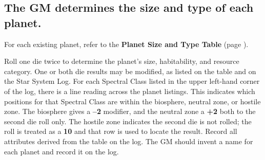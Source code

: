 \begin{table}[htbp]
  \centering
\end{table}

\subsection[Size And Type]{The GM determines the size and type of
  each planet.}
\label{sec:size-and-type}
 
For each existing planet, refer to the \textbf{Planet Size and Type
  Table} (page \pageref{tab:planet-size-type}).

Roll one die twice to determine the planet's size, habitability, and
resource category. One or both die results may be modified, as listed
on the table and on the Star System Log. For each Spectral Class
listed in the upper left-hand corner of the log, there is a line
reading across the planet listings. This indicates which positions for
that Spectral Class are within the biosphere, neutral zone, or hostile
zone.  The biosphere gives a \textbf{--2} modifier, and the neutral
zone a \textbf{+2} both to the second die roll only. The hostile
zone indicates the second die is not rolled; the roll is treated as a
\textbf{10} and that row is used to locate the result. Record all
attributes derived from the table on the log.  The GM should invent a
name for each planet and record it on the log.

